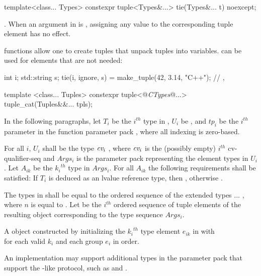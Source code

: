 %
%
%
\begin{itemdecl}
template<class... Types>
  constexpr tuple<Types&...> tie(Types&... t) noexcept;
\end{itemdecl}

\begin{itemdescr}
\pnum
\returns  {}.  When an
argument in  is , assigning
any value to the corresponding tuple element has no effect.

\pnum
\enterexample
{} functions allow one to create tuples that unpack
tuples into variables.  can be used for elements that
are not needed:
\begin{codeblock}
int i; std::string s;
tie(i, ignore, s) = make_tuple(42, 3.14, "C++");
// , 
\end{codeblock}
\exitexample
\end{itemdescr}

\begin{itemdecl}
template <class... Tuples>
  constexpr tuple<@\textit{CTypes}@...> tuple_cat(Tuples&&... tpls);
\end{itemdecl}

\begin{itemdescr}
\pnum
In the following paragraphs, let $T_i$ be the $i^{th}$ type in ,
$U_i$ be , and $tp_i$ be the $i^{th}$
parameter in the function parameter pack , where all indexing is
zero-based.

\pnum
\requires For all $i$, $U_i$ shall be the type
$\textit{cv}_i$ , where $\textit{cv}_i$ is the (possibly empty) $i^{th}$
cv-qualifier-seq and $Args_i$ is the parameter pack representing the element
types in $U_i$. Let ${A_{ik}}$ be the ${k_i}^{th}$ type in $Args_i$. For all
$A_{ik}$ the following requirements shall be satisfied: If $T_i$ is
deduced as an lvalue reference type, then
, otherwise
.

\pnum
\remarks The types in  shall be equal to the ordered
sequence of the extended types
 ... , where $n$ is
equal to . Let  be the $i^{th}$
ordered sequence of tuple elements of the resulting  object
corresponding to the type sequence $Args_i$.

\pnum
\returns A  object constructed by initializing the ${k_i}^{th}$
type element $e_{ik}$ in  with\\
 for each valid $k_i$ and
each group $e_i$ in order.

\pnum
\realnote An implementation may support additional types in the parameter
pack  that support the -like protocol, such as
 and .
\end{itemdescr}


